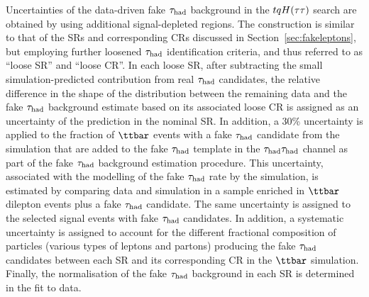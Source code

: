Uncertainties of the data-driven fake $\tau_{\mathrm{had}}$ background in the $tqH(\tau\tau)$ search are obtained by using additional signal-depleted regions. The construction is similar to that of the SRs and corresponding CRs discussed in Section~\ref{sec:fakeleptons}, but employing further loosened $\tau_{\mathrm{had}}$ identification criteria, and thus referred to as ``loose SR''  and ``loose CR''. 
In each loose SR, after subtracting the small simulation-predicted contribution from real $\tau_{\mathrm{had}}$ candidates, 
the relative difference in the shape of the distribution between the remaining data and the fake $\tau_{\mathrm{had}}$ background estimate based on its associated loose CR 
is assigned as an uncertainty of the prediction in the nominal SR.
In addition, a 30\% uncertainty is applied to the fraction of $\ttbar$ events with a fake $\tau_{\mathrm{had}}$ candidate from the simulation that are added to the fake $\tau_{\mathrm{had}}$ template in the $\tau_{\mathrm{had}} \tau_{\mathrm{had}}$ channel as part of the fake $\tau_{\mathrm{had}}$ background estimation procedure. This uncertainty, associated with the modelling of the fake $\tau_{\mathrm{had}}$ rate by the simulation, is estimated by comparing data and simulation in a sample enriched in $\ttbar$ dilepton events plus a fake $\tau_{\mathrm{had}}$ candidate. 
The same uncertainty is assigned to the selected signal events with fake $\tau_{\mathrm{had}}$ candidates.
In addition, a systematic uncertainty is assigned to account for the different fractional composition of particles (various types of leptons and partons) producing the fake $\tau_{\mathrm{had}}$ candidates 
between each SR and its corresponding CR in the $\ttbar$ simulation. 
Finally, the normalisation of the fake $\tau_{\mathrm{had}}$ background in each SR is determined in the fit to data. 

